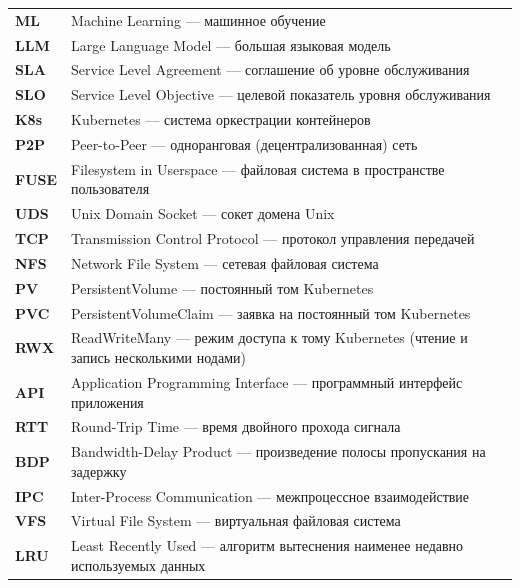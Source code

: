 
\begin{longtable}{@{}p{22mm}@{\hspace{4mm}}p{\dimexpr\textwidth-26mm\relax}@{}}
\textbf{ML}  & Machine Learning --- машинное обучение \\
\textbf{LLM} & Large Language Model --- большая языковая модель \\
\textbf{SLA} & Service Level Agreement --- соглашение об уровне обслуживания \\
\textbf{SLO} & Service Level Objective --- целевой показатель уровня обслуживания \\
\textbf{K8s} & Kubernetes --- система оркестрации контейнеров \\
\textbf{P2P} & Peer-to-Peer --- одноранговая (децентрализованная) сеть \\
\textbf{FUSE} & Filesystem in Userspace --- файловая система в пространстве пользователя \\
\textbf{UDS} & Unix Domain Socket --- сокет домена Unix \\
\textbf{TCP} & Transmission Control Protocol --- протокол управления передачей \\
\textbf{NFS} & Network File System --- сетевая файловая система \\
\textbf{PV}  & PersistentVolume --- постоянный том Kubernetes \\
\textbf{PVC} & PersistentVolumeClaim --- заявка на постоянный том Kubernetes \\
\textbf{RWX} & ReadWriteMany --- режим доступа к тому Kubernetes (чтение и запись несколькими нодами) \\
\textbf{API} & Application Programming Interface --- программный интерфейс приложения \\
\textbf{RTT} & Round-Trip Time --- время двойного прохода сигнала \\
\textbf{BDP} & Bandwidth-Delay Product --- произведение полосы пропускания на задержку \\
\textbf{IPC} & Inter-Process Communication --- межпроцессное взаимодействие \\
\textbf{VFS} & Virtual File System --- виртуальная файловая система \\
\textbf{LRU} & Least Recently Used --- алгоритм вытеснения наименее недавно используемых данных \\

\end{longtable}
